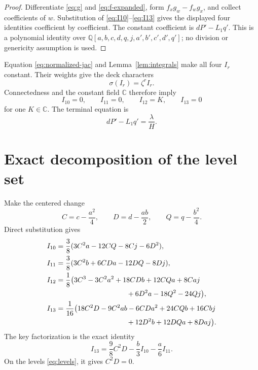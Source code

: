 \documentclass[11pt]{article}
\theoremstyle{definition}
\theoremstyle{remark}
\newcommand{\C}{\mathbb C}
\begin{document}
\begin{proof}
Differentiate \eqref{eq:g} and \eqref{eq:f-expanded}, form
\(f_xg_w-f_wg_x\), and collect coefficients of \(w\).
Substitution of \eqref{eq:I10}--\eqref{eq:I13} gives the displayed
four identities coefficient by coefficient.  The constant coefficient
is \(dP'-L_1q'\).  This is a polynomial identity over
\(\mathbb Q[a,b,c,d,q,j,a',b',c',d',q']\); no division or genericity
assumption is used.
\end{proof}

Equation \eqref{eq:normalized-jac} and
Lemma~\ref{lem:integrals} make all four \(I_r\) constant.  Their weights
give the deck characters
\[
 \sigma(I_r)=\zeta^rI_r.
\]
Connectedness and the constant field \(\C\) therefore imply
\begin{equation}
 \boxed{
 I_{10}=0,\qquad I_{11}=0,\qquad I_{12}=K,\qquad I_{13}=0
 }
\label{eq:levels}
\end{equation}
for one \(K\in\C\).  The terminal equation is
\begin{equation}
 \boxed{dP'-L_1q'=\frac{\lambda}{H}.}
\label{eq:terminal}
\end{equation}

\section{Exact decomposition of the level set}
\label{sec:decomposition}

Make the centered change
\[
 C=c-\frac{a^2}{4},\qquad
 D=d-\frac{ab}{2},\qquad
 Q=q-\frac{b^2}{4}.
\]
Direct substitution gives
\begin{align}
 I_{10}&={3\over8}
 (3C^2a-12CQ-8Cj-6D^2),\label{eq:center10}\\
 I_{11}&={3\over8}
 (3C^2b+6CDa-12DQ-8Dj),\label{eq:center11}\\
 I_{12}&={1\over8}\bigl(
 3C^3-3C^2a^2+18CDb+12CQa+8Caj \notag\\
 &\hspace{35mm}{}+6D^2a-18Q^2-24Qj\bigr),\label{eq:center12}\\
 I_{13}&={1\over16}\bigl(
 18C^2D-9C^2ab-6CDa^2+24CQb+16Cbj \notag\\
 &\hspace{35mm}{}+12D^2b+12DQa+8Daj\bigr).\label{eq:center13}
\end{align}
The key factorization is the exact identity
\begin{equation}
 \boxed{
 I_{13}=\frac98C^2D-\frac b3I_{10}-\frac a6I_{11}.
 }
\label{eq:keyfactor}
\end{equation}
On the levels \eqref{eq:levels}, it gives \(C^2D=0\).
\end{document}
